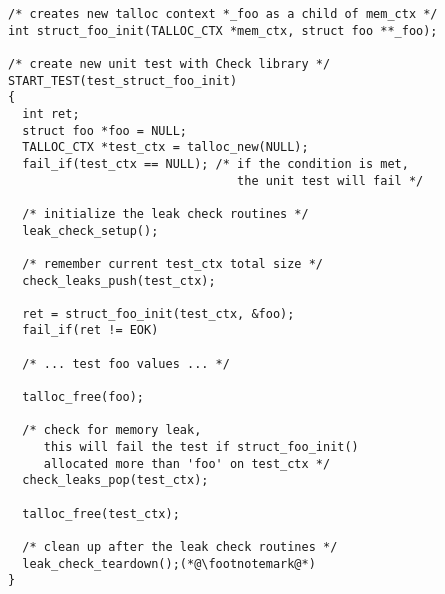 \begin{lstlisting}[caption={Memory leaks detection \#2},
morekeywords={leak_check_setup,check_leaks_push,
              check_leaks_pop,leak_check_teardown}]
/* creates new talloc context *_foo as a child of mem_ctx */
int struct_foo_init(TALLOC_CTX *mem_ctx, struct foo **_foo);

/* create new unit test with Check library */
START_TEST(test_struct_foo_init)
{
  int ret;
  struct foo *foo = NULL;
  TALLOC_CTX *test_ctx = talloc_new(NULL);
  fail_if(test_ctx == NULL); /* if the condition is met,
                                the unit test will fail */
  
  /* initialize the leak check routines */
  leak_check_setup();
  
  /* remember current test_ctx total size */
  check_leaks_push(test_ctx);
  
  ret = struct_foo_init(test_ctx, &foo);
  fail_if(ret != EOK)
  
  /* ... test foo values ... */
  
  talloc_free(foo);
  
  /* check for memory leak,
     this will fail the test if struct_foo_init()
     allocated more than 'foo' on test_ctx */
  check_leaks_pop(test_ctx);
  
  talloc_free(test_ctx);
  
  /* clean up after the leak check routines */
  leak_check_teardown();(*@\footnotemark@*)
}
\end{lstlisting}
